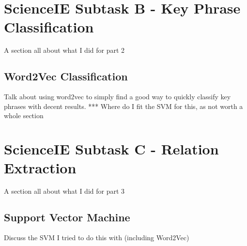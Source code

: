 \section{ScienceIE Subtask B - Key Phrase Classification}
A section all about what I did for part 2
\subsection{Word2Vec Classification}
Talk about using word2vec to simply find a good way to quickly classify key phrases with decent results.
*** Where do I fit the SVM for this, as not worth a whole section

\section{ScienceIE Subtask C - Relation Extraction}
A section all about what I did for part 3
\subsection{Support Vector Machine}
Discuss the SVM I tried to do this with (including Word2Vec)
